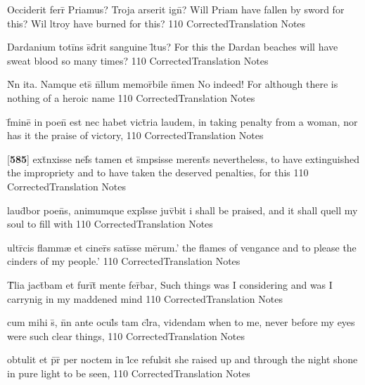 \latline
  {Occiderit ferr\={} Priamus?  Troja arserit ign\={\macron {\i}}?}
  { Will Priam have fallen by sword for this?  Wil ltroy have burned for this? }
  {110}
  { CorrectedTranslation }
  { Notes }


\latline
  {Dardanium toti\={}ns s\={}d\={}rit sanguine l\={\macron {\i}}tus?}
  { For this the Dardan beaches will have sweat blood so many times? }
  {110}
  { CorrectedTranslation }
  { Notes }


\latline
  {N\={}n ita.  Namque ets\={\macron {\i}} n\={}llum memor\={}bile n\={}men}
  { No indeed!  For although there is nothing of a heroic name }
  {110}
  { CorrectedTranslation }
  { Notes }


\latline
  {f\={}mine\={} in poen\={} est nec habet vict\={}ria laudem,}
  { in taking penalty from a woman, nor has it the praise of victory, }
  {110}
  { CorrectedTranslation }
  { Notes }


\latline
  {[\textbf{585}] ext\={\macron {\i}}nxisse nef\={}s tamen et s\={}mpsisse merent\={\macron {\i}}s}
  { nevertheless, to have extinguished the impropriety and to have taken the deserved penalties, for this }
  {110}
  { CorrectedTranslation }
  { Notes }


\latline
  {laud\={}bor poen\={}s, animumque expl\={}sse juv\={}bit}
  { i shall be praised, and it shall quell my soul to fill with  }
  {110}
  { CorrectedTranslation }
  { Notes }


\latline
  {ultr\={\macron {\i}}cis flamm{\ae} et ciner\={}s sati\={}sse me\={}rum.'}
  { the flames of vengance and to please the cinders of my people.' }
  {110}
  { CorrectedTranslation }
  { Notes }

\latline
  {T\={}lia jact\={}bam et furi\={}t\={} mente fer\={}bar,}
  { Such things was I considering and was I carrynig in my maddened mind }
  {110}
  { CorrectedTranslation }
  { Notes }


\latline
  {cum mihi s\={}, n\={}n ante ocul\={\macron {\i}}s tam cl\={}ra, videndam}
  { when to me, never before my eyes were such clear things, }
  {110}
  { CorrectedTranslation }
  { Notes }


\latline
  {obtulit et p\={}r\={} per noctem in l\={}ce refulsit}
  { she raised up and through the night shone in pure light to be seen, }
  {110}
  { CorrectedTranslation }
  { Notes }


